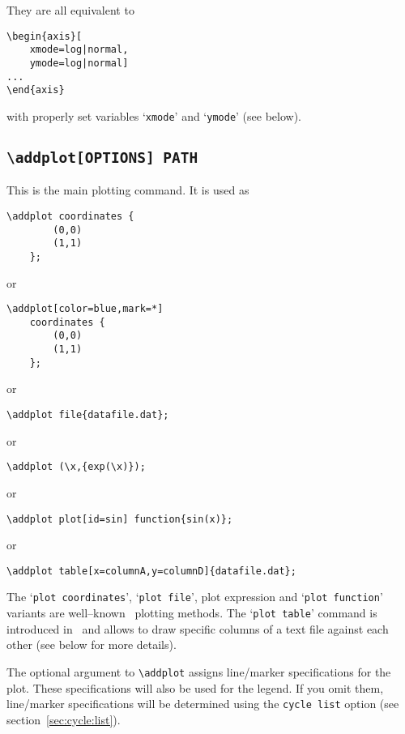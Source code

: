 They are all equivalent to
\begin{lstlisting}
\begin{axis}[
	xmode=log|normal,
	ymode=log|normal]
...
\end{axis}
\end{lstlisting}
with properly set variables `\texttt{xmode}' and `\texttt{ymode}' (see below).

\subsection{\texttt{\textbackslash addplot[OPTIONS] PATH}}
\label{sec:addplot}%
This is the main plotting command. It is used as
\begin{lstlisting}
\addplot coordinates {
		(0,0)
		(1,1)
	};
\end{lstlisting}
or
\begin{lstlisting}
\addplot[color=blue,mark=*]
	coordinates {
		(0,0)
		(1,1)
	};
\end{lstlisting}
or
\begin{lstlisting}
\addplot file{datafile.dat};
\end{lstlisting}
or
\begin{lstlisting}
\addplot (\x,{exp(\x)});
\end{lstlisting}
or
\begin{lstlisting}
\addplot plot[id=sin] function{sin(x)};
\end{lstlisting}
or
\begin{lstlisting}
\addplot table[x=columnA,y=columnD]{datafile.dat};
\end{lstlisting}
The `\texttt{plot coordinates}', `\texttt{plot file}', plot expression and `\texttt{plot function}' variants are well--known \Tikz\ plotting methods. The `\texttt{plot table}' command is introduced in \PGFPlots\ and allows to draw specific columns of a text file against each other (see below for more details).

The optional argument to \lstinline!\addplot! assigns line/marker specifications for the plot. These specifications will also be used for the legend. If you omit them, line/marker specifications will be determined using the \texttt{cycle list}  option (see section~\ref{sec:cycle:list}).

